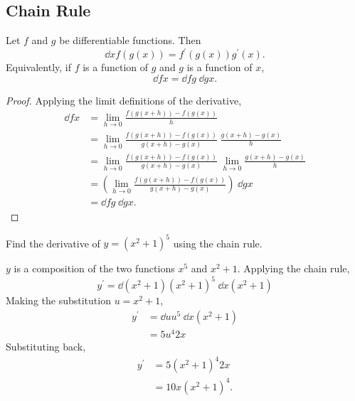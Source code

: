 \subsection{Chain Rule}
\begin{lemma}
	Let $f$ and $g$ be differentiable functions. Then
	\begin{equation}
		\dd{}{x}f(g(x)) = f^\prime(g(x))g^\prime(x).
	\end{equation}
	Equivalently, if $f$ is a function of $g$ and $g$ is a function of $x$,
	\begin{equation}
		\dd{f}{x} = \dd{f}{g}\hspace{3pt}\dd{g}{x}.
	\end{equation}
\end{lemma}
\begin{proof}
	Applying the limit definitions of the derivative,
	\begin{align*}
		\dd{f}{x} &= \lim_{h \to 0}{\frac{f(g(x+h))-f(g(x))}{h}} \\
		&= \lim_{h\to 0}{\frac{f(g(x+h))-f(g(x))}{g(x+h)-g(x)}\hspace{3pt}\frac{g(x+h)-g(x)}{h}} \\
		&= \lim_{h\to 0}{\frac{f(g(x+h))-f(g(x))}{g(x+h)-g(x)}} \hspace{3pt} \lim_{h\to 0}{\frac{g(x+h)-g(x)}{h}} \\
		&= \left(\lim_{h\to 0}{\frac{f(g(x+h))-f(g(x))}{g(x+h)-g(x)}}\right) \hspace{3pt} \dd{g}{x} \\
		&= \dd{f}{g}\hspace{3pt}\dd{g}{x}.
	\end{align*}
\end{proof}

\begin{example}
	Find the derivative of $y = (x^2 + 1)^5$ using the chain rule.
\end{example}
$y$ is a composition of the two functions $x^5$ and $x^2 + 1$.
Applying the chain rule, 
\begin{equation*}
	y^\prime = \dd{}{(x^2+1)}(x^2+1)^5 \hspace{3pt} \dd{}{x}(x^2+1)
\end{equation*}
\indent
Making the substitution $u = x^2 + 1$,
\begin{align*}
	y^\prime &= \dd{}{u}u^5 \hspace{3pt} \dd{}{x}(x^2+1) \\
	&= 5u^{4}2x
\end{align*}
\indent
Substituting back,
\begin{align*}
	y^\prime &= 5(x^2+1)^{4}2x \\
	&= 10x(x^2+1)^4.
\end{align*}

